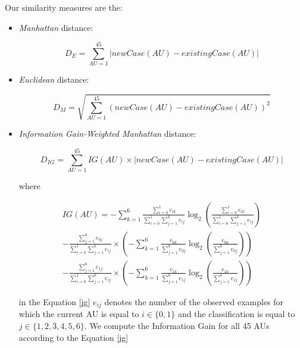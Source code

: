 \documentclass[a4paper]{article}
\begin{document}
Our similarity measures are the:
\begin{itemize}

\item \emph{Manhattan} distance:

\begin{equation}
D_E = \sum_{AU = 1}^{45} \left | newCase(AU) - existingCase(AU)\right |
\end{equation}

\item \emph{Euclidean} distance:

\begin{equation}
D_M = \sqrt{ \sum_{AU = 1}^{45} \left ( newCase(AU) - existingCase(AU)\right )^{2} }
\end{equation}

\item \emph{Information Gain-Weighted Manhattan} distance:

\begin{equation}
D_{IG} = \sum_{AU = 1}^{45} IG(AU)\times \left | newCase(AU) - existingCase(AU)\right |
\end{equation}

where

\begin{equation}
\begin{split}
IG(AU) = -\sum_{k=1}^{6} \frac{ \sum_{i=0}^{1} e_{ik} }{ \sum_{i=0}^{1} \sum_{j=1}^{6} e_{ij} } \log_{2} \left ( \frac{ \sum_{i=0}^{1} e_{ik} }{ \sum_{i=0}^{1} \sum_{j=1}^{6} e_{ij} } \right ) \\
- \frac{ \sum_{j=1}^{6} e_{0j} }{ \sum_{i=0}^{1} \sum_{j=1}^{6} e_{ij} } \times \left ( - \sum_{k=1}^{6} \frac{ e_{0k} }{ \sum_{j=1}^{6} e_{0j} } \log_{2} \left ( \frac{ e_{0k} }{ \sum_{j=1}^{6} e_{0j} } \right ) \right ) \\
- \frac{ \sum_{j=1}^{6} e_{1j} }{ \sum_{i=0}^{1} \sum_{j=1}^{6} e_{ij} } \times \left ( - \sum_{k=1}^{6} \frac{ e_{1k} }{ \sum_{j=1}^{6} e_{1j} } \log_{2} \left ( \frac{ e_{1k} }{ \sum_{j=1}^{6} e_{1j} } \right ) \right )
\end{split}
\label{ig}
\end{equation}

in the Equation \ref{ig} $e_{ij}$ denotes the number of the observed examples for which the current AU is equal to $i \in \{0,1\}$ and the classification is equal to $j \in \{1,2,3,4,5,6\}$. We compute the Information Gain for all 45 AUs according to the Equation \ref{ig}

\end{itemize}
\end{document}
